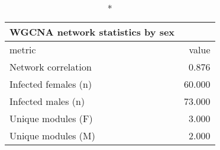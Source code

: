 \begin{longtable}{lr}
\caption*{
{\large WGCNA network statistics by sex}
} \\ 
\toprule
metric & value \\ 
\midrule\addlinespace[2.5pt]
Network correlation & 0.876 \\ 
Infected females (n) & 60.000 \\ 
Infected males (n) & 73.000 \\ 
Unique modules (F) & 3.000 \\ 
Unique modules (M) & 2.000 \\ 
\bottomrule
\end{longtable}

